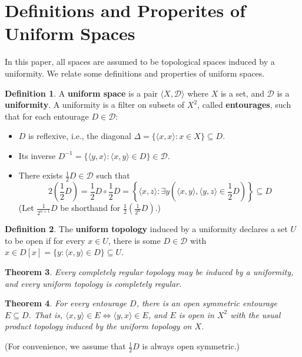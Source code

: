 \documentclass{amsart}
\newtheorem{thm}{Theorem}[section]
\theoremstyle{definition}
\newtheorem{defn}[thm]{Definition}
\theoremstyle{remark}
\newcommand{\mc}{\mathcal}
\newcommand{\<}{\langle}
\renewcommand{\>}{\rangle}
\begin{document}
\section{Definitions and Properites of Uniform Spaces}

In this paper, all spaces are assumed to be topological spaces induced by a uniformity. We relate some definitions and properties of uniform spaces.

\begin{defn}
  A \textbf{uniform space} is a pair $\<X,\mc{D}\>$ where $X$ is a set, and $\mc{D}$ is a \textbf{uniformity}. A uniformity is a filter on subsets of $X^2$, called \textbf{entourages}, such that for each entourage $D\in \mc D$:
  \begin{itemize}
      \item $D$ is reflexive, i.e., the diagonal $\Delta=\{\<x,x\>:x\in X\}\subseteq D$.
      \item Its inverse $D^{-1}=\{\<y,x\>:\<x,y\>\in D\}\in \mc D$.
      \item There exists $\frac{1}{2}D\in\mc D$ such that 
        \[
          2\left(\frac{1}{2}D\right)=\frac{1}{2}D\circ \frac{1}{2}D=\left\{\<x,z\>:\exists y\left(\<x,y\>,\<y,z\>\in \frac{1}{2}D\right)\right\}\subseteq D
        \]
      (Let $\frac{1}{2^{n+1}}D$ be shorthand for $\frac{1}{2}(\frac{1}{2^{n}}D)$.)
    \end{itemize}
\end{defn}

\begin{defn}
  The \textbf{uniform topology} induced by a uniformity declares a set $U$ to be open if for every $x\in U$, there is some $D\in\mc D$ with $x\in D[x]=\{y: \<x,y\>\in D\}\subseteq U$.
\end{defn}

\begin{thm}
  Every completely regular topology may be induced by a uniformity, and every uniform topology is completely regular.
\end{thm}

\begin{thm}
  For every entourage $D$, there is an open symmetric entourage $E\subseteq D$. That is, $\<x,y\>\in E \Leftrightarrow \<y,x\> \in E$, and $E$ is open in $X^2$ with the usual product topology induced by the uniform topology on $X$.
\end{thm}

(For convenience, we assume that $\frac{1}{2}D$ is always open symmetric.)
\end{document}
